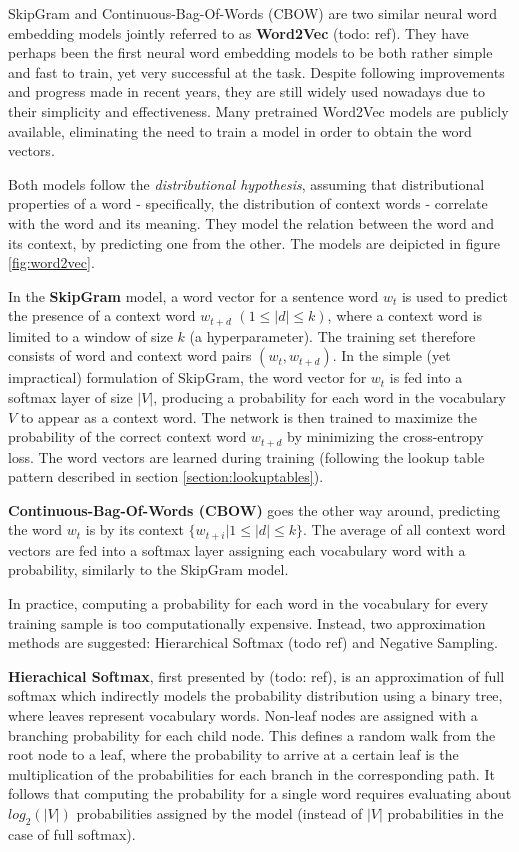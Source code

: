 SkipGram and Continuous-Bag-Of-Words (CBOW) are two similar neural word embedding models jointly referred to as \textbf{Word2Vec} (todo: ref). They have perhaps been the first neural word embedding models to be both rather simple and fast to train, yet very successful at the task. Despite following improvements and progress made in recent years, they are still widely used nowadays due to their simplicity and effectiveness. Many pretrained Word2Vec models are publicly available, eliminating the need to train a model in order to obtain the word vectors. 

Both models follow the \emph{distributional hypothesis}, assuming that distributional properties of a word - specifically, the distribution of context words - correlate with the word and its meaning. They model the relation between the word and its context, by predicting one from the other. The models are deipicted in figure \ref{fig:word2vec}. 

In the \textbf{SkipGram} model, a word vector for a sentence word $w_t$ is used to predict the presence of a context word $w_{t+d}$ $(1 \leq |d| \leq k)$, where a context word is limited to a window of size $k$ (a hyperparameter). The training set therefore consists of word and context word pairs $(w_t, w_{t+d})$. In the simple (yet impractical) formulation of SkipGram, the word vector for $w_t$ is fed into a softmax layer of size $|V|$, producing a probability for each word in the vocabulary $V$ to appear as a context word. The network is then trained to maximize the probability of the correct context word $w_{t+d}$ by minimizing the cross-entropy loss. The word vectors are learned during training (following the lookup table pattern described in section \ref{section:lookuptables}).

\textbf{Continuous-Bag-Of-Words (CBOW)} goes the other way around, predicting the word $w_t$ is by its context $\{w_{t+i} | 1 \leq |d| \leq k\}$. The average of all context word vectors are fed into a softmax layer assigning each vocabulary word with a probability, similarly to the SkipGram model. 

In practice, computing a probability for each word in the vocabulary for every training sample is too computationally expensive. Instead, two approximation methods are suggested: Hierarchical Softmax (todo ref) and Negative Sampling. 

\textbf{Hierachical Softmax}, first presented by (todo: ref), is an approximation of full softmax which indirectly models the probability distribution using a binary tree, where leaves represent vocabulary words. Non-leaf nodes are assigned with a branching probability for each child node. This defines a random walk from the root node to a leaf, where the probability to arrive at a certain leaf is the multiplication of the probabilities for each branch in the corresponding path. It follows that computing the probability for a single word requires evaluating about $log_2(|V|)$ probabilities assigned by the model (instead of $|V|$ probabilities in the case of full softmax).

